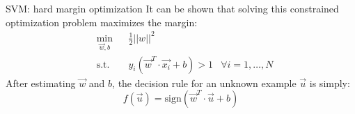 \begin{frame}{SVM: hard margin optimization}
It can be shown that solving this constrained optimization problem maximizes the margin:
\begin{equation*}
\begin{aligned}
& \min_{\vec{w},b} & & \frac{1}{2}||w||^2\\
& \text{s.t.} & &  y_i(\vec{w}^T\cdot\vec{x_i} + b)>1 & \forall i=1,\ldots,N
\end{aligned}
\end{equation*}
After estimating $\vec{w}$ and $b$, the decision rule for an unknown example $\vec{u}$ is simply:
\begin{equation*}
f(\vec{u}) = \text{sign}(\vec{w}^T\cdot\vec{u} + b)
\end{equation*}


\end{frame}